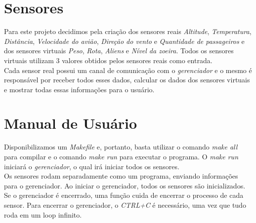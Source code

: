 \documentclass[10pt,a4paper]{article}
\begin{document}
\section{Sensores}
Para este projeto decidimos pela criação dos sensores reais \textit{Altitude}, \textit{Temperatura}, \textit{Distância}, \textit{Velocidade do avião}, \textit{Direção do vento} e \textit{Quantidade de passageiros} e dos sensores virtuais \textit{Peso}, \textit{Rota}, \textit{Aliens} e \textit{Nível da zoeira}. Todos os sensores virtuais utilizam 3 valores obtidos pelos sensores reais como entrada.\\
Cada sensor real possui um canal de comunicação com o \textit{gerenciador} e o mesmo é responsável por receber todos esses dados, calcular os dados dos sensores virtuais e mostrar todas essas informações para o usuário.\\
\section{Manual de Usuário}
Disponibilizamos um \textit{Makefile} e, portanto, basta utilizar o comando \textit{make all} para compilar e o comando \textit{make run} para executar o programa. O \textit{make run} iniciará o \textit{gerenciador}, o qual irá iniciar todos os sensores.\\
Os sensores rodam separadamente como um programa, enviando informações para o gerenciador. Ao iniciar o gerenciador, todos os sensores são inicializados. Se o gerenciador é encerrado, uma função cuida de encerrar o processo de cada sensor. Para encerrar o gerenciador, o \textit{CTRL+C} é necessário, uma vez que tudo roda em um loop infinito.
\end{document}
